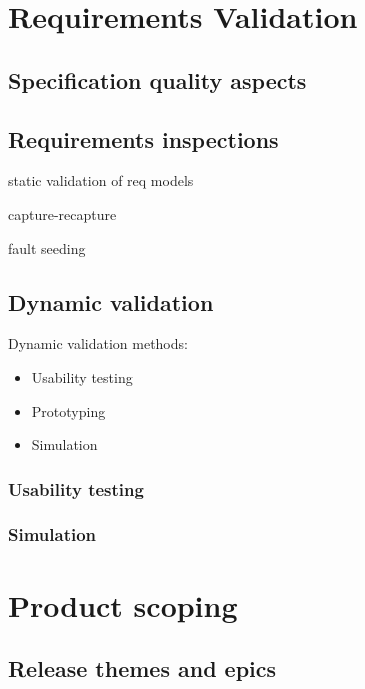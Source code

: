 \documentclass{reqengbook}
\begin{document}
\chapter{Requirements Validation}

\section{Specification quality aspects}


\section{Requirements inspections}
static validation of req models

capture-recapture

fault seeding

\section{Dynamic validation}

Dynamic validation methods:
\begin{itemize}
  \item Usability testing
  \item Prototyping
  \item Simulation
\end{itemize}

\subsection{Usability testing}

\subsection{Simulation}


\chapter{Product scoping}

\section{Release themes and epics}
\end{document}
